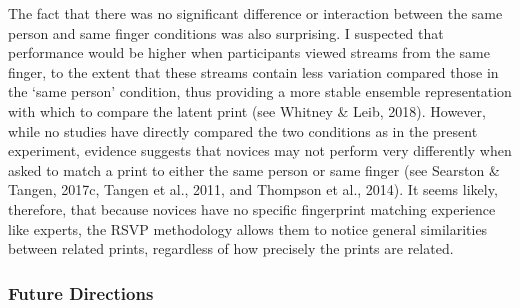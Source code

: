 \documentclass[
  english,
  man]{apa6}
\begin{document}
The fact that there was no significant difference or interaction between the same person and same finger conditions was also surprising. I suspected that performance would be higher when participants viewed streams from the same finger, to the extent that these streams contain less variation compared those in the `same person' condition, thus providing a more stable ensemble representation with which to compare the latent print (see Whitney \& Leib, 2018). However, while no studies have directly compared the two conditions as in the present experiment, evidence suggests that novices may not perform very differently when asked to match a print to either the same person or same finger (see Searston \& Tangen, 2017c, Tangen et al., 2011, and Thompson et al., 2014). It seems likely, therefore, that because novices have no specific fingerprint matching experience like experts, the RSVP methodology allows them to notice general similarities between related prints, regardless of how precisely the prints are related.

\hypertarget{future-directions}{%
\subsubsection{Future Directions}\label{future-directions}}
\end{document}
